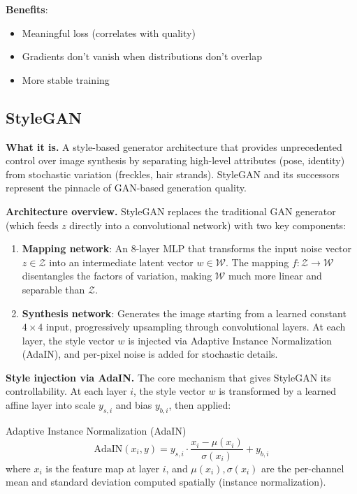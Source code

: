 \textbf{Benefits}:
\begin{itemize}
    \item Meaningful loss (correlates with quality)
    \item Gradients don't vanish when distributions don't overlap
    \item More stable training
\end{itemize}

\subsection{StyleGAN}

\textbf{What it is.} A style-based generator architecture that provides unprecedented control over image synthesis by separating high-level attributes (pose, identity) from stochastic variation (freckles, hair strands). StyleGAN and its successors represent the pinnacle of GAN-based generation quality.

\textbf{Architecture overview.} StyleGAN replaces the traditional GAN generator (which feeds $z$ directly into a convolutional network) with two key components:

\begin{enumerate}
    \item \textbf{Mapping network}: An 8-layer MLP that transforms the input noise vector $z \in \mathcal{Z}$ into an intermediate latent vector $w \in \mathcal{W}$. The mapping $f: \mathcal{Z} \to \mathcal{W}$ disentangles the factors of variation, making $\mathcal{W}$ much more linear and separable than $\mathcal{Z}$.

    \item \textbf{Synthesis network}: Generates the image starting from a learned constant $4 \times 4$ input, progressively upsampling through convolutional layers. At each layer, the style vector $w$ is injected via Adaptive Instance Normalization (AdaIN), and per-pixel noise is added for stochastic details.
\end{enumerate}

\textbf{Style injection via AdaIN.} The core mechanism that gives StyleGAN its controllability. At each layer $i$, the style vector $w$ is transformed by a learned affine layer into scale $y_{s,i}$ and bias $y_{b,i}$, then applied:

\begin{mathresult}{Adaptive Instance Normalization (AdaIN)}
\begin{equation}
\text{AdaIN}(x_i, y) = y_{s,i} \cdot \frac{x_i - \mu(x_i)}{\sigma(x_i)} + y_{b,i}
\end{equation}
where $x_i$ is the feature map at layer $i$, and $\mu(x_i), \sigma(x_i)$ are the per-channel mean and standard deviation computed spatially (instance normalization).
\end{mathresult}

